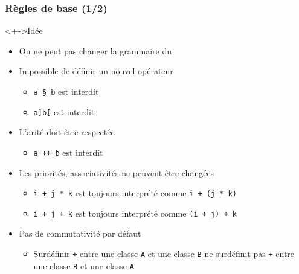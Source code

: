 \begin{frame}
\frametitle{Règles de base (1/2)}
\begin{exampleblock}<+->{Idée}
	\begin{itemize}[<+->]
	\item On ne peut pas changer la grammaire du \cpp
	\end{itemize}
\end{exampleblock}
\begin{itemize}[<+->]
\item Impossible de définir un nouvel opérateur
	\begin{itemize}
	\item \texttt{a § b} est interdit
	\item \texttt{a]b[} est interdit
	\end{itemize}
\item L'arité doit être respectée
	\begin{itemize}
	\item \texttt{a ++ b} est interdit
	\end{itemize}
\item Les priorités, associativités ne peuvent être changées
	\begin{itemize}
	\item \texttt{i + j * k} est toujours interprété comme \texttt{i + (j * k)}
	\item \texttt{i + j + k} est toujours interprété comme \texttt{(i + j) + k}
	\end{itemize}
\item Pas de commutativité par défaut
	\begin{itemize}
	\item Surdéfinir \texttt{+} entre une classe \texttt{A} et une classe \texttt{B} ne surdéfinit pas \texttt{+} entre une classe \texttt{B} et une classe \texttt{A}
	\end{itemize}
\end{itemize}
\end{frame}

